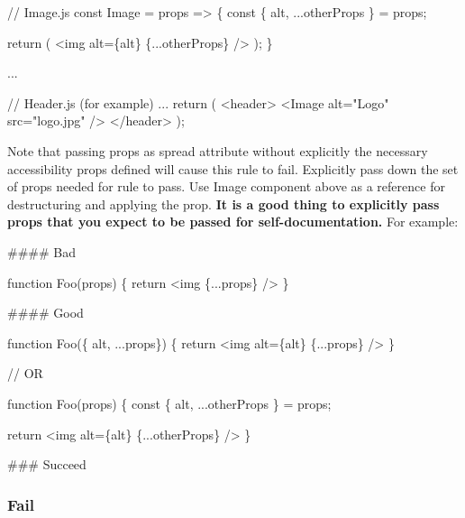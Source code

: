 \begin{DoxyCode}
// Image.js
const Image = props => \{
  const \{
    alt,
    ...otherProps
  \} = props;

  return (
    <img alt=\{alt\} \{...otherProps\} />
  );
\}

...

// Header.js (for example)
...
return (
  <header>
    <Image alt="Logo" src="logo.jpg" />
  </header>
);
\end{DoxyCode}


Note that passing props as spread attribute without explicitly the necessary accessibility props defined will cause this rule to fail. Explicitly pass down the set of props needed for rule to pass. Use {\ttfamily Image} component above as a reference for destructuring and applying the prop. {\bfseries It is a good thing to explicitly pass props that you expect to be passed for self-\/documentation.} For example\+:

\#\#\#\# Bad 
\begin{DoxyCode}
function Foo(props) \{
  return <img \{...props\} />
\}
\end{DoxyCode}


\#\#\#\# Good 
\begin{DoxyCode}
function Foo(\{ alt, ...props\}) \{
    return <img alt=\{alt\} \{...props\} />
\}

// OR

function Foo(props) \{
    const \{
        alt,
        ...otherProps
    \} = props;

   return <img alt=\{alt\} \{...otherProps\} />
\}
\end{DoxyCode}


\#\#\# Succeed 


\subsubsection*{Fail}


